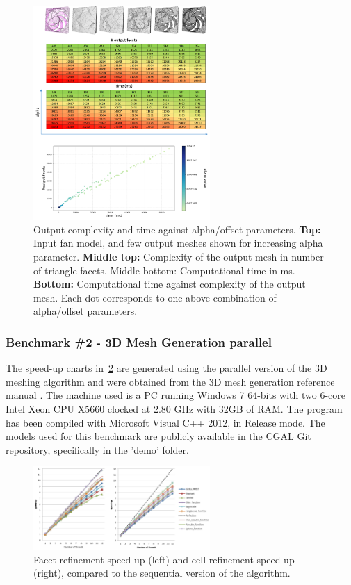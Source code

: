 \begin{figure}[htb]
    \centering
    \includegraphics[width=0.6\textwidth]{graphics/cgal/fan.png} 
    \caption{Output complexity and time against alpha/offset parameters.
\textbf{Top:} Input fan model, and few output meshes shown for increasing alpha parameter. \textbf{Middle top:} Complexity of the output mesh in number of triangle
facets. Middle bottom: Computational time in ms. \textbf{Bottom:} Computational time against complexity of the output mesh. Each dot corresponds to one above combination of alpha/offset parameters.}
\label{WP1::CGAL::aw3}
\end{figure}



\subsubsection{Benchmark \#2 - 3D Mesh Generation parallel}

The speed-up charts in~\cref{WP1::CGAL::mg3parallel} are generated using the parallel version of the 3D meshing algorithm and were obtained from the 3D mesh generation reference manual \cite{alliez_3d_2024}. 
The machine used is a PC running Windows 7 64-bits with two 6-core Intel Xeon CPU X5660 clocked at 2.80 GHz with 32GB of RAM. The program has been compiled with Microsoft Visual C++ 2012, in Release mode.
The models used for this benchmark are publicly available in the CGAL Git repository, specifically in the 'demo' folder.

\begin{figure}[htb]
    \centering
    \includegraphics[width=0.6\textwidth]{graphics/cgal/refinement_speedup.png} 
    \caption{Facet refinement speed-up (left) and cell refinement speed-up (right), compared to the sequential version of the algorithm.}
    \label{WP1::CGAL::mg3parallel}
\end{figure}


